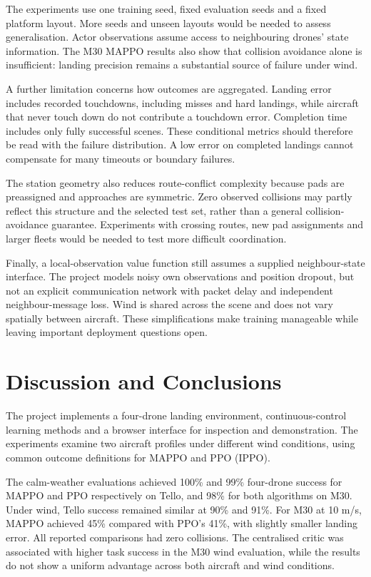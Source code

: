 The experiments use one training seed, fixed evaluation seeds and a fixed platform layout. More seeds and unseen layouts would be needed to assess generalisation. Actor observations assume access to neighbouring drones' state information. The M30 MAPPO results also show that collision avoidance alone is insufficient: landing precision remains a substantial source of failure under wind.

A further limitation concerns how outcomes are aggregated. Landing error includes recorded touchdowns, including misses and hard landings, while aircraft that never touch down do not contribute a touchdown error. Completion time includes only fully successful scenes. These conditional metrics should therefore be read with the failure distribution. A low error on completed landings cannot compensate for many timeouts or boundary failures.

The station geometry also reduces route-conflict complexity because pads are preassigned and approaches are symmetric. Zero observed collisions may partly reflect this structure and the selected test set, rather than a general collision-avoidance guarantee. Experiments with crossing routes, new pad assignments and larger fleets would be needed to test more difficult coordination.

Finally, a local-observation value function still assumes a supplied neighbour-state interface. The project models noisy own observations and position dropout, but not an explicit communication network with packet delay and independent neighbour-message loss. Wind is shared across the scene and does not vary spatially between aircraft. These simplifications make training manageable while leaving important deployment questions open.

\hypertarget{discussion-and-conclusions}{%
\section{Discussion and Conclusions}\label{discussion-and-conclusions}}

The project implements a four-drone landing environment, continuous-control learning methods and a browser interface for inspection and demonstration. The experiments examine two aircraft profiles under different wind conditions, using common outcome definitions for MAPPO and PPO (IPPO).

The calm-weather evaluations achieved 100\% and 99\% four-drone success for MAPPO and PPO respectively on Tello, and 98\% for both algorithms on M30. Under wind, Tello success remained similar at 90\% and 91\%. For M30 at 10 m/s, MAPPO achieved 45\% compared with PPO's 41\%, with slightly smaller landing error. All reported comparisons had zero collisions. The centralised critic was associated with higher task success in the M30 wind evaluation, while the results do not show a uniform advantage across both aircraft and wind conditions.

